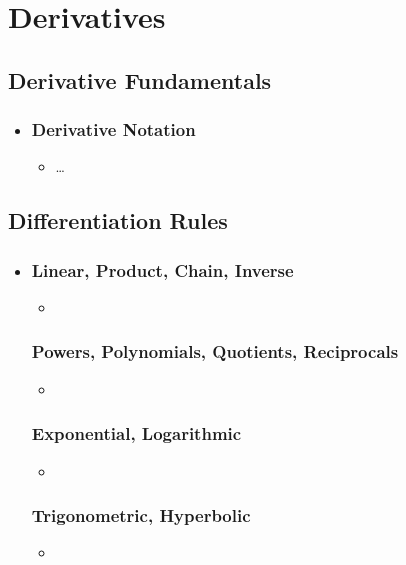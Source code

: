 \chapter{Derivatives}

\section{Derivative Fundamentals}
\begin{itemize}
  \item []

  \subsection{Derivative Notation}
  \begin{itemize}
    \item \ldots
  \end{itemize}
\end{itemize}

\section{Differentiation Rules}
\begin{itemize}
  \item []

  \subsection{Linear, Product, Chain, Inverse}
  \begin{itemize}
    \item
  \end{itemize}

  \subsection{Powers, Polynomials, Quotients, Reciprocals}
  \begin{itemize}
    \item
  \end{itemize}

  \subsection{Exponential, Logarithmic}
  \begin{itemize}
    \item
  \end{itemize}

  \subsection{Trigonometric, Hyperbolic}
  \begin{itemize}
    \item
  \end{itemize}
\end{itemize}



